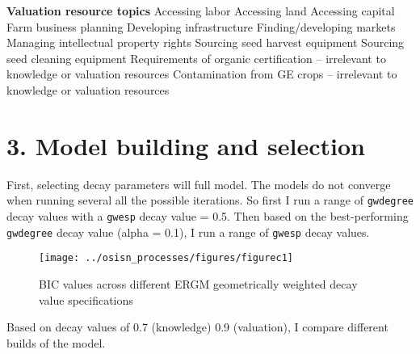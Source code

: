 \documentclass[twoside,12pt,final]{ucthesis-CA2012}
\begin{document}
\begin{ucmainmatter}
\textbf{Valuation resource topics}
Accessing labor
Accessing land
Accessing capital
Farm business planning
Developing infrastructure
Finding/developing markets
Managing intellectual property rights
Sourcing seed harvest equipment
Sourcing seed cleaning equipment
Requirements of organic certification -- irrelevant to knowledge or valuation resources
Contamination from GE crops -- irrelevant to knowledge or valuation resources

\hypertarget{model-building-and-selection}{%
\section{3. Model building and selection}\label{model-building-and-selection}}

First, selecting decay parameters will full model. The models do not converge when running several all the possible iterations. So first I run a range of \texttt{gwdegree} decay values with a \texttt{gwesp} decay value = 0.5. Then based on the best-performing \texttt{gwdegree} decay value (alpha = 0.1), I run a range of \texttt{gwesp} decay values.
\begin{figure}

{\centering \texttt{[image: ../osisn\_processes/figures/figurec1]} 

}

\caption{BIC values across different ERGM geometrically weighted decay value specifications}\label{fig:unnamed-chunk-28}
\end{figure}
Based on decay values of 0.7 (knowledge) 0.9 (valuation), I compare different builds of the model.
\begin{table}


\end{table}
\end{ucmainmatter}
\end{document}
